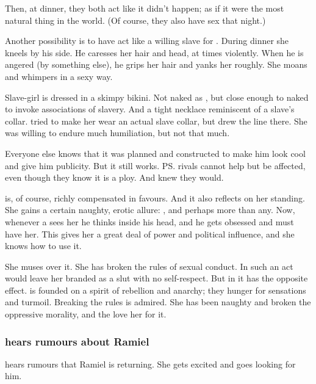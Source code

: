 \begin{garbage}
Then, at dinner, they both act like it didn't happen;
as if it were the most natural thing in the world. 
(Of course, they also have sex that night.)

Another possibility is to have \Cishiel{} act like a willing slave for \Dasteron. 
During dinner she kneels by his side. 
He caresses her hair and head, at times violently. 
When he is angered (by something else), he grips her hair and yanks her roughly. 
She moans and whimpers in a sexy way. 

Slave-girl \Cishiel{} is dressed in a skimpy bikini. 
Not naked as , but close enough to naked to invoke associations of slavery. 
And a tight necklace reminiscent of a slave's collar. 
\Dasteron{} tried to make her wear an actual slave collar, but \Cishiel{} drew the line there. 
She was willing to endure much humiliation, but not that much. 

Everyone else knows that it was planned and constructed to make him look cool and give him publicity. 
But it still works. 
\ps{\Dasteron} rivals cannot help but be affected, even though they know it is a ploy. 
And \Dasteron{} knew they would. 

\Cishiel{} is, of course, richly compensated in favours. 
And it also reflects on her standing. 
She gains a certain naughty, erotic allure: 
, and \Mystraacht{} perhaps more than any.
Now, whenever a \resphan{} sees her he thinks  inside his head, and he gets obsessed and must have her. 
This gives her a great deal of power and political influence, and she knows how to use it. 

She muses over it. 
She has broken the rules of sexual conduct. 
In \CiriathSepher{} such an act would leave her branded as a slut with no self-respect. 
But in \Mystraacht{} it has the opposite effect. 
\Mystraacht{} is founded on a spirit of rebellion and anarchy; they hunger for sensations and turmoil. 
Breaking the rules is admired. 
She has been naughty and broken the oppressive \CiriathSepher{} morality, and the \Mystraacht{} love her for it. 





\subsubsection{\Cishiel{} hears rumours about Ramiel}
\Cishiel{} hears rumours that Ramiel is returning. 
She gets excited and goes looking for him. 


\end{garbage}
